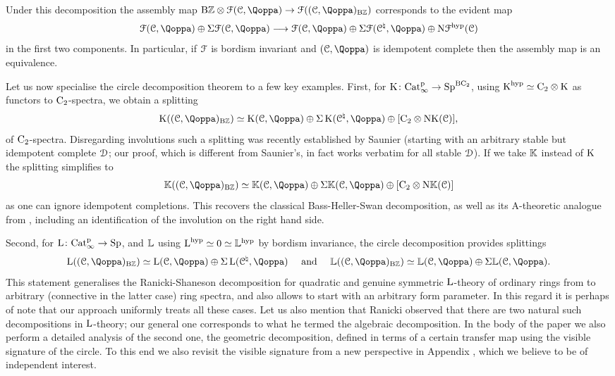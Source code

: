 Under this decomposition the assembly map 
$
\mathrm B\mathbb Z \otimes \F(\C,\QF) \to \F((\C,\QF)_{\mathrm B\mathbb Z})
$
corresponds to the evident map
\[
\mathcal F(\C,\QF) \oplus \Sigma \mathcal F(\C,\QF) \longrightarrow \mathcal F(\C,\QF) \oplus \Sigma \mathcal F(\C^\natural,\QF) \oplus\mathrm N\F^\hyp(\C)
\]
in the first two components. %
In particular, if $\mathcal{F}$ is bordism invariant and $(\C,\QF)$ is idempotent complete then the assembly map
is an equivalence.


Let us now specialise the circle decomposition theorem to a few key examples.
First, for $\operatorname K \colon \mathrm{Cat}^{\mathrm p}_\infty \rightarrow \mathrm{Sp}^{\mathrm{B}\mathrm{C_2}}$, using $\operatorname K^{\mathrm{hyp}} \simeq \mathrm{C_2}\otimes \operatorname K$ as functors to $\mathrm{C_2}$-spectra, we obtain a splitting
\[
\K((\C,\QF)_{\mathrm B\mathbb Z}) \simeq \K(\C,\QF) \oplus \Sigma \K(\C^\natural,\QF) \oplus [\Ct \otimes \mathrm{NK}(\C)],
\]
of $\mathrm{C_2}$-spectra. Disregarding involutions such a splitting was recently established by Saunier \cite{saunier} (starting with an arbitrary stable but idempotent complete $\mathcal{D}$; our proof, which is %
different from Saunier's, in fact works verbatim for all stable $\mathcal{D}$). If we take $\mathbb K$ instead of $\operatorname K$ the splitting simplifies to
\[
\KK((\C,\QF)_{\mathrm B\mathbb Z}) \simeq \KK(\C,\QF) \oplus \Sigma \KK(\C,\QF) \oplus [\Ct \otimes \N\KK(\C)]
\]
as one can ignore idempotent completions. %
This recovers the classical Bass-Heller-Swan decomposition, as well as its $\mathrm A$-theoretic analogue from \cites{fundamental-spaces, fundamental-spaces2}, including an identification of the involution on the right hand side.

Second, for $\operatorname L \colon \mathrm{Cat}^{\mathrm p}_\infty \rightarrow \mathrm{Sp}$, and $\mathbb{L}$ using $\operatorname L^{\mathrm{hyp}} \simeq 0 \simeq \mathbb{L}^{\mathrm{hyp}}$ by bordism invariance, the circle decomposition provides splittings
\[
\L((\C,\QF)_{\mathrm B\mathbb Z}) \simeq \L(\C,\QF) \oplus \Sigma \L(\C^\natural,\QF) \quad \text{ and } \quad \KL((\C,\QF)_{\mathrm B\mathbb Z}) \simeq \KL(\C,\QF) \oplus \Sigma \KL(\C,\QF).
\]
This statement generalises the Ranicki-Shaneson decomposition 
for %
quadratic and genuine symmetric $\operatorname L$-theory of ordinary rings from \cite{shaneson,Milgram-Ranicki} to arbitrary (connective in the latter case) ring spectra, and also allows to start with an arbitrary form parameter. In this regard it is perhaps of note that our approach uniformly treats all these cases. %
Let us also mention that Ranicki observed that 
there are two natural such decompositions in $\operatorname L$-theory; our general one corresponds to what he termed the algebraic decomposition. In the body of the paper we also perform a detailed analysis of the second one, the geometric decomposition, defined in terms of a certain transfer map using the visible signature of the circle. To this end we also revisit the visible signature from a new perspective in Appendix , which we believe to be of independent interest.



